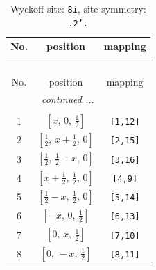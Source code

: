 \documentclass[fleqn,8pt]{jsarticle}
\begin{document}
\begin{longtable}{ccc}
\caption{Wyckoff site: {\tt 8i}, site symmetry: {\tt .2'.}}
 \\
 \hline \hline
No. & position & mapping \\ \hline \endfirsthead

\multicolumn{2}{l}{\tablename\ \thetable{}} \\
 \hline \hline
No. & position & mapping \\ \hline \endhead

 \hline \hline
\multicolumn{2}{r}{\footnotesize\it continued ...} \\ \endfoot

 \hline \hline
\multicolumn{2}{r}{} \\ \endlastfoot

1 & $\left[ x,\, 0,\, \frac{1}{2} \right]$ & {\tt [1,12]} \\ \hline
2 & $\left[ \frac{1}{2},\, x + \frac{1}{2},\, 0 \right]$ & {\tt [2,15]} \\ \hline
3 & $\left[ \frac{1}{2},\, \frac{1}{2} - x,\, 0 \right]$ & {\tt [3,16]} \\ \hline
4 & $\left[ x + \frac{1}{2},\, \frac{1}{2},\, 0 \right]$ & {\tt [4,9]} \\ \hline
5 & $\left[ \frac{1}{2} - x,\, \frac{1}{2},\, 0 \right]$ & {\tt [5,14]} \\ \hline
6 & $\left[ - x,\, 0,\, \frac{1}{2} \right]$ & {\tt [6,13]} \\ \hline
7 & $\left[ 0,\, x,\, \frac{1}{2} \right]$ & {\tt [7,10]} \\ \hline
8 & $\left[ 0,\, - x,\, \frac{1}{2} \right]$ & {\tt [8,11]} \\
\end{longtable}
\renewcommand{\arraystretch}{1.2}
\end{document}
